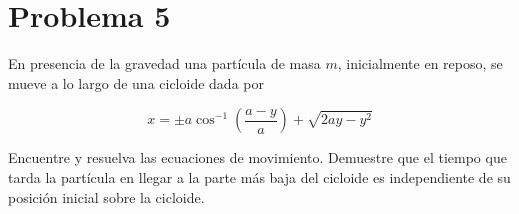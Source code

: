 \documentclass[a4paper,10pt]{article}
\numberwithin{equation}{section}
\begin{document}
% 
% 
% 
% 
% 
% 
% 
% 
% 
% 

\section{Problema 5}

En presencia de la gravedad una partícula de masa $m$, inicialmente en reposo, se 
mueve a lo largo de una cicloide dada por 

$$
x = \pm a \cos^{-1}{\left(\frac{a-y}{a}\right)} + \sqrt{2ay-y^2}
$$

Encuentre y resuelva las ecuaciones de movimiento. Demuestre que el tiempo que tarda 
la partícula en llegar a la parte más baja del cicloide es independiente de su 
posición inicial sobre la cicloide.
\end{document}

